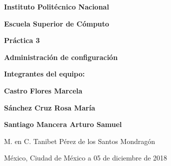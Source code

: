 \vspace{1cm}
\centerline{\Large \bf Instituto Politécnico Nacional}\vspace{.3cm}
\centerline{\Large \bf Escuela Superior de Cómputo}
\vspace{3cm}
\centerline{\Large \bf Práctica 3}\vspace{.3cm}
\centerline{\Large \bf Administración de configuración}


\vspace{2cm}
\centerline{\Large  \bf Integrantes del equipo:}
\vspace{1cm}
\centerline{\Large  \bf Castro Flores Marcela}
\vspace{.2cm}
\centerline{\Large  \bf Sánchez Cruz Rosa María}
\vspace{.2cm}
\centerline{\Large  \bf Santiago Mancera Arturo Samuel}

\vspace{2cm}

\centerline{\Large  M. en C. Tanibet Pérez de los Santos Mondragón }
 
\vspace{2cm}
\begin{center}
{\large  M\'{e}xico, Ciudad de México a 05 de diciembre de 2018}
\end{center}
